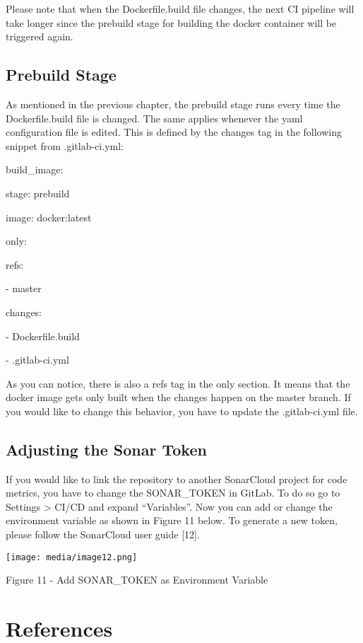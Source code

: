 \documentclass[]{book}
\begin{document}
Please note that when the Dockerfile.build file changes, the next CI pipeline will take longer since the prebuild stage for building the docker container will be triggered again.

\section{Prebuild Stage}\label{prebuild-stage}

As mentioned in the previous chapter, the prebuild stage runs every time the Dockerfile.build file is changed. The same applies whenever the yaml configuration file is edited. This is defined by the changes tag in the following snippet from .gitlab-ci.yml:

build\_image:

stage: prebuild

image: docker:latest

only:

refs:

- master

changes:

- Dockerfile.build

- .gitlab-ci.yml

As you can notice, there is also a refs tag in the only section. It means that the docker image gets only built when the changes happen on the master branch. If you would like to change this behavior, you have to update the .gitlab-ci.yml file.

\section{Adjusting the Sonar Token}\label{adjusting-the-sonar-token}

If you would like to link the repository to another SonarCloud project for code metrics, you have to change the SONAR\_TOKEN in GitLab. To do so go to Settings \textgreater{} CI/CD and expand ``Variables''. Now you can add or change the environment variable as shown in Figure 11 below. To generate a new token, please follow the SonarCloud user guide {[}12{]}.

\texttt{[image: media/image12.png]}

\protect\hypertarget{_Ref26970902}{}{}Figure 11 - Add SONAR\_TOKEN as Environment Variable

\chapter{References }\label{references}
\end{document}
